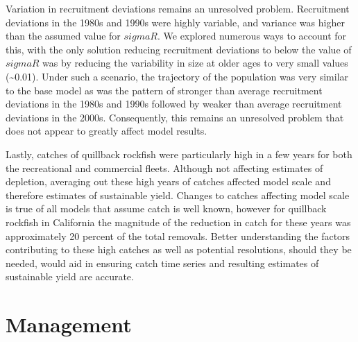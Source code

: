 \documentclass[11pt,
  english,
  a4paper,
]{article}
\begin{document}
Variation in recruitment deviations remains an unresolved problem. Recruitment deviations in the 1980s and 1990s were highly variable, and variance was higher than the assumed value for {\(sigmaR\)\leavevmode\tagmcend\tagstructend}. We explored numerous ways to account for this, with the only solution reducing recruitment deviations to below the value of {\(sigmaR\)\leavevmode\tagmcend\tagstructend} was by reducing the variability in size at older ages to very small values (\textasciitilde0.01). Under such a scenario, the trajectory of the population was very similar to the base model as was the pattern of stronger than average recruitment deviations in the 1980s and 1990s followed by weaker than average recruitment deviations in the 2000s. Consequently, this remains an unresolved problem that does not appear to greatly affect model results.

\leavevmode\tagmcend\tagstructend\par


Lastly, catches of quillback rockfish were particularly high in a few years for both the recreational and commercial fleets. Although not affecting estimates of depletion, averaging out these high years of catches affected model scale and therefore estimates of sustainable yield. Changes to catches affecting model scale is true of all models that assume catch is well known, however for quillback rockfish in California the magnitude of the reduction in catch for these years was approximately 20 percent of the total removals. Better understanding the factors contributing to these high catches as well as potential resolutions, should they be needed, would aid in ensuring catch time series and resulting estimates of sustainable yield are accurate.

\leavevmode\tagmcend\tagstructend\par


\hypertarget{management}{%
\section{Management}\label{management}}

\leavevmode\tagmcend\tagstructend

\end{document}
